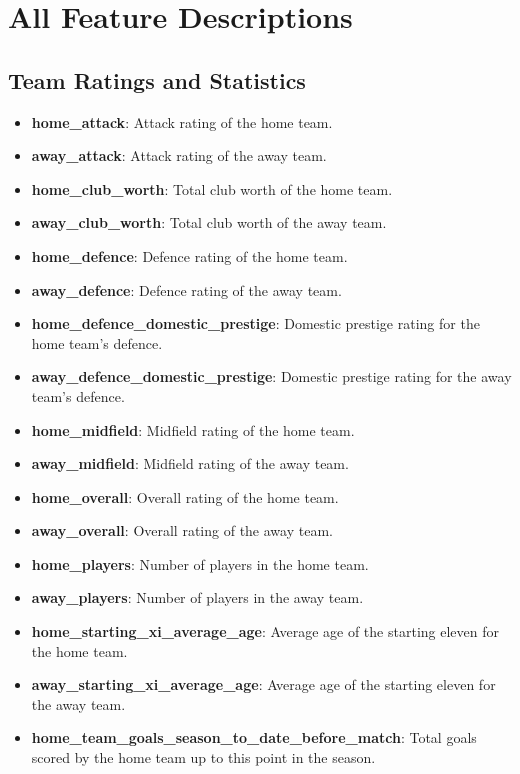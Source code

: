\chapter{All Feature Descriptions}
\label{appendix:all_feature_descriptions}

\section{Team Ratings and Statistics}
\begin{itemize}
    \item \textbf{home\_attack}: Attack rating of the home team.
    \item \textbf{away\_attack}: Attack rating of the away team.
    \item \textbf{home\_club\_worth}: Total club worth of the home team.
    \item \textbf{away\_club\_worth}: Total club worth of the away team.
    \item \textbf{home\_defence}: Defence rating of the home team.
    \item \textbf{away\_defence}: Defence rating of the away team.
    \item \textbf{home\_defence\_domestic\_prestige}: Domestic prestige rating for the home team's defence.
    \item \textbf{away\_defence\_domestic\_prestige}: Domestic prestige rating for the away team's defence.
    \item \textbf{home\_midfield}: Midfield rating of the home team.
    \item \textbf{away\_midfield}: Midfield rating of the away team.
    \item \textbf{home\_overall}: Overall rating of the home team.
    \item \textbf{away\_overall}: Overall rating of the away team.
    \item \textbf{home\_players}: Number of players in the home team.
    \item \textbf{away\_players}: Number of players in the away team.
    \item \textbf{home\_starting\_xi\_average\_age}: Average age of the starting eleven for the home team.
    \item \textbf{away\_starting\_xi\_average\_age}: Average age of the starting eleven for the away team.
    \item \textbf{home\_team\_goals\_season\_to\_date\_before\_match}: Total goals scored by the home team up to this point in the season.

\end{itemize}

